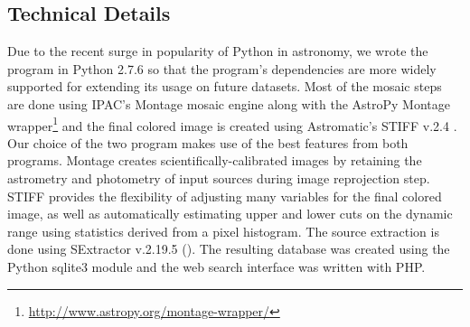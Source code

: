 \documentclass[5p]{elsarticle}
\begin{document}
		\subsection{Technical Details}
		Due to the recent surge in popularity of Python in astronomy, we wrote the program in Python 2.7.6 so that the program's dependencies are more widely supported for extending its usage on future datasets. Most of the mosaic steps are done using IPAC's Montage  \cite{montage} mosaic engine along with the AstroPy Montage wrapper\footnote{\url{http://www.astropy.org/montage-wrapper/}} and the final colored image is created using Astromatic's STIFF v.2.4 \cite{stiff}. Our choice of the two program makes use of the best features from both programs. Montage creates scientifically-calibrated images by retaining the astrometry and photometry of input sources during image reprojection step. STIFF provides the flexibility of adjusting many variables for the final colored image, as well as automatically estimating upper and lower cuts on the dynamic range using statistics derived from a pixel histogram.  %
The source extraction is done using SExtractor v.2.19.5 (\citet{sextractor}). The resulting database was created using the Python sqlite3 module and the web search interface was written with PHP.
\end{document}
